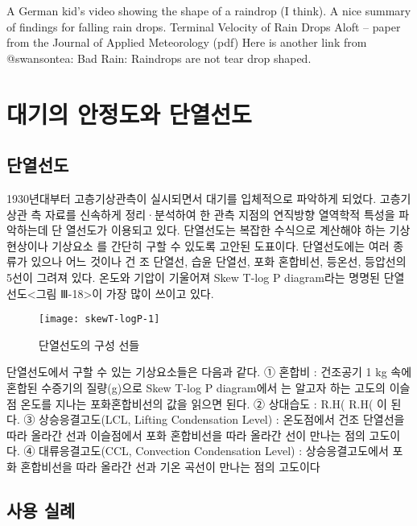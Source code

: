 A German kid’s video showing the shape of a raindrop (I think).
A nice summary of findings for falling rain drops.
Terminal Velocity of Rain Drops Aloft – paper from the Journal of Applied Meteorology (pdf)
Here is another link from @swansontea: Bad Rain: Raindrops are not tear drop shaped.


\chapter{대기의 안정도와 단열선도}

\section{단열선도}
1930년대부터 고층기상관측이 실시되면서 대기를 입체적으로 파악하게 되었다. 고층기상관
측 자료를 신속하게 정리·분석하여 한 관측 지점의 연직방향 열역학적 특성을 파악하는데 단
열선도가 이용되고 있다. 단열선도는 복잡한 수식으로 계산해야 하는 기상 현상이나 기상요소
를 간단히 구할 수 있도록 고안된 도표이다. 단열선도에는 여러 종류가 있으나 어느 것이나 건
조 단열선, 습윤 단열선, 포화 혼합비선, 등온선, 등압선의 5선이 그려져 있다. 온도와 기압이
기울어져 Skew T-log P diagram라는 명명된 단열선도<그림 Ⅲ-18>이 가장 많이 쓰이고 있다.

\begin{figure}[h]
	\centering
	\texttt{[image: skewT-logP-1]}
	\caption{단열선도의 구성 선들}
	\label{fig:skewt-logp}
\end{figure}

단열선도에서 구할 수 있는 기상요소들은 다음과 같다.
① 혼합비 : 건조공기 1 kg 속에 혼합된 수증기의 질량(g)으로 Skew T-log P diagram에서
는 알고자 하는 고도의 이슬점 온도를 지나는 포화혼합비선의 값을 읽으면 된다.
② 상대습도 : R.H(%
R.H(%
이 된다.
③ 상승응결고도(LCL, Lifting Condensation Level) : 온도점에서 건조 단열선을 따라 올라간
선과 이슬점에서 포화 혼합비선을 따라 올라간 선이 만나는 점의 고도이다.
④ 대류응결고도(CCL, Convection Condensation Level) : 상승응결고도에서 포화 혼합비선을
따라 올라간 선과 기온 곡선이 만나는 점의 고도이다


\section{사용 실례}

